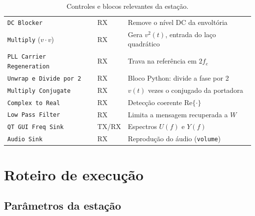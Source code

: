 \documentclass[11pt,a4paper]{article}
\begin{document}
\begin{table}[H]
\begin{tabular}{l l l}
            \texttt{DC Blocker}                        & RX             & Remove o nível DC da envoltória                    \\
            \texttt{Multiply} ($v\cdot v$)             & RX             & Gera $v^2(t)$, entrada do laço quadrático          \\
            \texttt{PLL Carrier Regeneration}          & RX             & Trava na referência em $2f_e$                      \\
            \texttt{Unwrap e Divide por 2}             & RX             & Bloco Python: divide a fase por 2                  \\
            \texttt{Multiply Conjugate}                & RX             & $v(t)$ vezes o conjugado da portadora              \\
            \texttt{Complex to Real}                   & RX             & Detecção coerente $\mathrm{Re}\{\cdot\}$           \\
            \texttt{Low Pass Filter}                   & RX             & Limita a mensagem recuperada a $W$                 \\
            \texttt{QT GUI Freq Sink}                  & TX/RX          & Espectros $U(f)$ e $Y(f)$                          \\
            \texttt{Audio Sink}                        & RX             & Reprodução do áudio (\texttt{volume})              \\
            \bottomrule
      \end{tabular}
      \caption{Controles e blocos relevantes da estação.}
\end{table}

\section{Roteiro de execução}

\subsection*{Parâmetros da estação}
\end{document}
